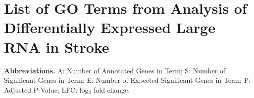 \chapter{List of GO Terms from Analysis of Differentially Expressed Large RNA in Stroke} 
\label{appendix:go-terms-large-rna}

\noindent \textbf{Abbreviations.} A: Number of Annotated Genes in Term; S: Number of Significant Genes in Term; E: Number of Expected Significant Genes in Term; P: Adjusted P-Value; LFC: log$_2$ fold change.

\vspace{20pt}
 
